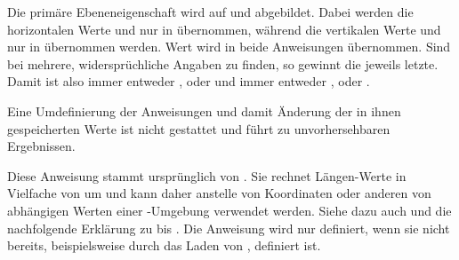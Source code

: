 Die primäre Ebeneneigenschaft  wird auf
 und
 abgebildet. Dabei werden die horizontalen Werte 
und  nur in  übernommen, während die vertikalen
Werte  und  nur in  übernommen
werden. %
Wert  wird in
beide Anweisungen übernommen. Sind bei  mehrere,
widersprüchliche Angaben zu finden, so gewinnt die jeweils letzte. Damit ist
also  immer entweder ,  oder 
und  immer entweder ,  oder .

Eine Umdefinierung der Anweisungen und damit Änderung der in
ihnen gespeicherten Werte ist nicht gestattet und führt zu unvorhersehbaren
Ergebnissen.%
\EndIndexGroup


\begin{Declaration}
\end{Declaration}
Diese Anweisung stammt ursprünglich von
. Sie rechnet Längen-Werte in Vielfache von  um und kann
daher anstelle von Koordinaten oder anderen von  abhängigen
Werten einer -Umgebung verwendet werden. Siehe dazu auch
\cite{package:eso-pic} und die nachfolgende Erklärung zu
 bis . Die
Anweisung wird nur definiert, wenn sie nicht bereits, beispielsweise durch das
Laden von , definiert ist.%

\EndIndexGroup


